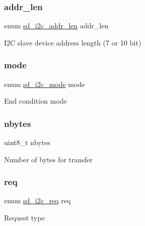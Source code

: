 \subsubsection{\texorpdfstring{addr\+\_\+len}{addr\_len}}
{\footnotesize\ttfamily enum \mbox{\hyperlink{group___s_d___i2_c___types_ga1abb9f3e149e857548cfa3288be0be80}{sd\+\_\+i2c\+\_\+addr\+\_\+len}} addr\+\_\+len}

I2C slave device address length (7 or 10 bit) \mbox{\label{structsd__i2c__dev__cfg_a0c2ed6c8922cc263a64954af15c30164}} 
\subsubsection{\texorpdfstring{mode}{mode}}
{\footnotesize\ttfamily enum \mbox{\hyperlink{group___s_d___i2_c___types_ga082fa398268d3004bcdde8772078013c}{sd\+\_\+i2c\+\_\+mode}} mode}

End condition mode \mbox{\label{structsd__i2c__dev__cfg_a1dd08fc6e4d60cbf48ee9beeeda4b5bc}} 
\subsubsection{\texorpdfstring{nbytes}{nbytes}}
{\footnotesize\ttfamily uint8\+\_\+t nbytes}

Number of bytes for transfer \mbox{\label{structsd__i2c__dev__cfg_a7147bab5e0c48a261ae145a970221d7b}} 
\subsubsection{\texorpdfstring{req}{req}}
{\footnotesize\ttfamily enum \mbox{\hyperlink{group___s_d___i2_c___types_gaf19c3b18fa107e09353acbf263f8a730}{sd\+\_\+i2c\+\_\+req}} req}

Request type \mbox{\label{structsd__i2c__dev__cfg_a500518ac1160f8bbf53c07dc91c30c1f}} 
